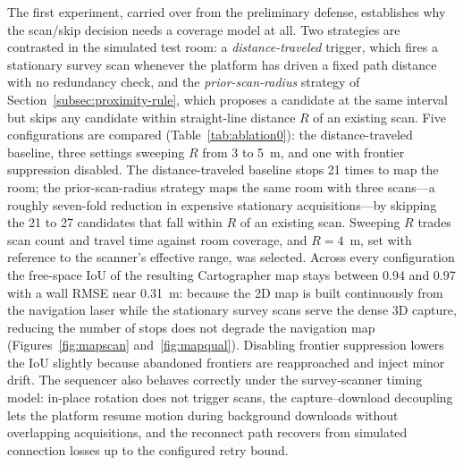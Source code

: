 The first experiment, carried over from the preliminary defense, establishes
why the scan/skip decision needs a coverage model at all. Two strategies are
contrasted in the simulated test room: a \emph{distance-traveled} trigger,
which fires a stationary survey scan whenever the platform has driven a fixed
path distance with no redundancy check, and the \emph{prior-scan-radius}
strategy of Section~\ref{subsec:proximity-rule}, which proposes a candidate at
the same interval but skips any candidate within straight-line distance $R$ of
an existing scan. Five configurations are compared (Table~\ref{tab:ablation0}):
the distance-traveled baseline, three settings sweeping $R$ from 3 to 5~m, and
one with frontier suppression disabled. The distance-traveled baseline stops
21 times to map the room; the prior-scan-radius strategy maps the same room
with three scans---a roughly seven-fold reduction in expensive stationary
acquisitions---by skipping the 21 to 27 candidates that fall within $R$ of an
existing scan. Sweeping $R$ trades scan count and travel time against room
coverage, and $R=4$~m, set with reference to the scanner's effective range, was
selected. Across every configuration the free-space IoU of the resulting
Cartographer map stays between 0.94 and 0.97 with a wall RMSE near 0.31~m:
because the 2D map is built continuously from the navigation laser while the
stationary survey scans serve the dense 3D capture, reducing the number of
stops does not degrade the navigation map (Figures~\ref{fig:mapscan}
and~\ref{fig:mapqual}). Disabling frontier suppression lowers the IoU slightly
because abandoned frontiers are reapproached and inject minor drift. The
sequencer also behaves correctly under the survey-scanner timing model:
in-place rotation does not trigger scans, the capture--download decoupling lets
the platform resume motion during background downloads without overlapping
acquisitions, and the reconnect path recovers from simulated connection losses
up to the configured retry bound.


